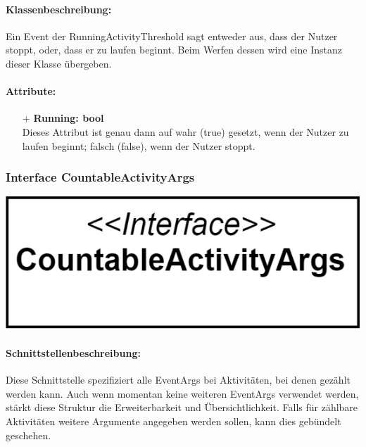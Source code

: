 \documentclass[a4paper,12pt]{article}
\begin{document}
	\paragraph{Klassenbeschreibung:}
	Ein Event der RunningActivityThreshold sagt entweder aus, dass der Nutzer stoppt, oder, dass er zu laufen beginnt. Beim Werfen dessen wird eine Instanz dieser Klasse übergeben.
	\paragraph{Attribute:}
	\begin{itemize}
		\item[+] \textbf{Running: bool}\\ Dieses Attribut ist genau dann auf wahr (true) gesetzt, wenn der Nutzer zu laufen beginnt; falsch (false), wenn der Nutzer stoppt.\\
	\end{itemize} 

	\begin{minipage}[b]{0.6\textwidth}
		\subsubsection{Interface CountableActivityArgs}
	\end{minipage}
	\begin{minipage}[c]{0.5\textwidth}
		\includegraphics{bilder/EMKlassen/CountableActivityArgsInterface.png}
	\end{minipage}

	\paragraph{Schnittstellenbeschreibung:}
	Diese Schnittstelle spezifiziert alle EventArgs bei Aktivitäten, bei denen gezählt werden kann. Auch wenn momentan keine weiteren EventArgs verwendet werden, stärkt diese Struktur die Erweiterbarkeit und Übersichtlichkeit. Falls für zählbare Aktivitäten weitere Argumente angegeben werden sollen, kann dies gebündelt geschehen.\\
	\newline
	
\end{document}
